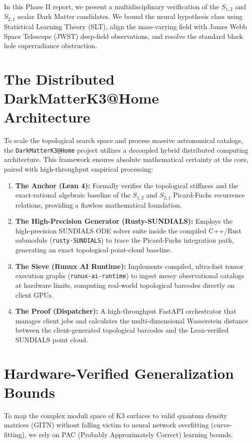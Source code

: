 \documentclass[aps,prd,twocolumn,nofootinbib,superscriptaddress,10pt]{revtex4-2}
\begin{document}
In this Phase II report, we present a multidisciplinary verification of the $S_{1,2}$ and $S_{2,1}$ scalar Dark Matter candidates. We bound the neural hypothesis class using Statistical Learning Theory (SLT), align the mass-varying field with James Webb Space Telescope (JWST) deep-field observations, and resolve the standard black hole superradiance obstruction.

\section{The Distributed DarkMatterK3@Home Architecture}

To scale the topological search space and process massive astronomical catalogs, the \texttt{DarkMatterK3@Home} project utilizes a decoupled hybrid distributed computing architecture. This framework ensures absolute mathematical certainty at the core, paired with high-throughput empirical processing:
\begin{enumerate}
    \item \textbf{The Anchor (Lean 4):} Formally verifies the topological stiffness and the exact-rational algebraic baseline of the $S_{1,2}$ and $S_{2,1}$ Picard-Fuchs recurrence relations, providing a flawless mathematical foundation.
    \item \textbf{The High-Precision Generator (Rusty-SUNDIALS):} Employs the high-precision SUNDIALS ODE solver suite inside the compiled C++/Rust submodule (\texttt{rusty-SUNDIALS}) to trace the Picard-Fuchs integration path, generating an exact topological point-cloud baseline.
    \item \textbf{The Sieve (Runux AI Runtime):} Implements compiled, ultra-fast tensor execution graphs (\texttt{runux-ai-runtime}) to ingest messy observational catalogs at hardware limits, computing real-world topological barcodes directly on client GPUs.
    \item \textbf{The Proof (Dispatcher):} A high-throughput FastAPI orchestrator that manages client jobs and calculates the multi-dimensional Wasserstein distance between the client-generated topological barcodes and the Lean-verified SUNDIALS point cloud.
\end{enumerate}

\section{Hardware-Verified Generalization Bounds}

To map the complex moduli space of K3 surfaces to valid quantum density matrices (GITN) without falling victim to neural network overfitting (curve-fitting), we rely on PAC (Probably Approximately Correct) learning bounds. 
\end{document}
